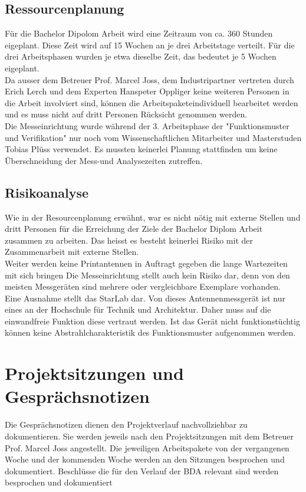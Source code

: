 \subsection{Ressourcenplanung}
Für die Bachelor Dipolom Arbeit wird eine Zeitraum von ca. 360 Stunden eigeplant. Diese Zeit wird auf 15 Wochen an je drei Arbeitstage verteilt. Für die drei Arbeitsphasen wurden je etwa dieselbe Zeit, das bedeutet je 5 Wochen eigeplant.\\
Da ausser dem Betreuer Prof. Marcel Joss, dem Industripartner vertreten durch Erich Lerch  und dem Experten Hanspeter Oppliger keine weiteren Personen in die Arbeit involviert sind, können die Arbeitspaketeindividuell bearbeitet werden und es muss nicht auf dritt Personen Rücksicht genommen werden.\\
Die Messeinrichtung wurde während der 3. Arbeitsphase der "Funktionsmuster und Verifikation" nur noch vom Wissenschaftlichen Mitarbeiter und Masterstuden Tobias Plüss verwendet. Es mussten keinerlei Planung stattfinden um keine Überschneidung der Mess-und Analysezeiten zutreffen. 

\subsection{Risikoanalyse}
Wie in der Resourcenplanung erwähnt, war es nicht nötig mit externe Stellen und dritt Personen für die Erreichung der Ziele der Bachelor Diplom Arbeit zusammen zu arbeiten. Das heisst es besteht keinerlei Risiko mit der Zusammenarbeit mit externe Stellen.\\
Weiter werden keine Printantennen in Auftragt gegeben die lange Wartezeiten mit sich bringen
Die Messeinrichtung stellt auch kein Risiko dar, denn von den meisten Messgeräten sind mehrere oder vergleichbare Exemplare vorhanden.\\
Eine Ausnahme stellt das StarLab dar. Von dieses Antennenmessgerät ist nur eines an der Hochschule für Technik und Architektur. Daher muss auf die einwandfreie Funktion diese vertraut werden. Ist das Gerät nicht funktionstüchtig können keine Abstrahlcharakteristik des Funktionsmuster aufgenommen werden.

\section{Projektsitzungen und Gesprächsnotizen}
Die Gesprächsnotizen dienen den Projektverlauf nachvollziehbar zu dokumentieren. Sie werden jeweils nach den Projektsitzungen mit dem Betreuer Prof. Marcel Joss angestellt. Die jeweiligen Arbeitspakete von der vergangenen Woche und der kommenden Woche werden an den Sitzungen besprochen und dokumentiert. Beschlüsse die für den Verlauf der BDA relevant sind werden besprochen und dokumentiert

